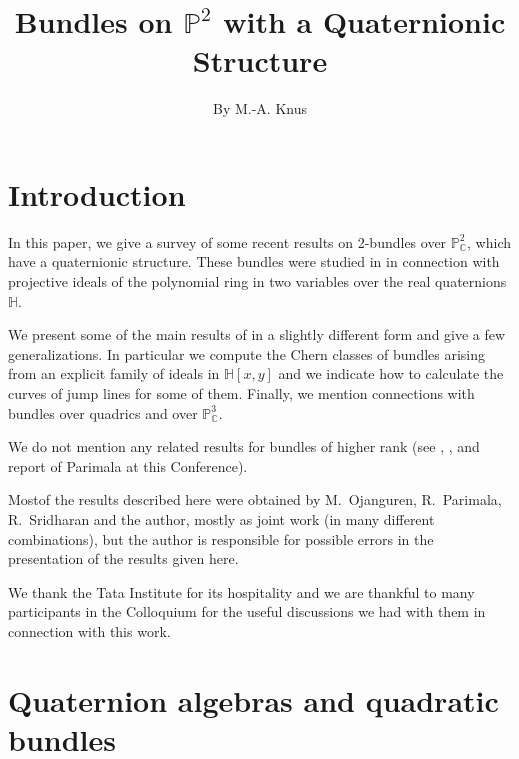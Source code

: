 \title{Bundles on $\mathbb{P}^{2}$ with a Quaternionic Structure}\label{chap9}

\author{By M.-A. Knus}

\date{}
\maketitle

\setcounter{page}{173}

\setcounter{pageoriginal}{224}
\section*{Introduction}\pageoriginale

In this paper, we give a survey of some recent results on 2-bundles
over $\mathbb{P}^{2}_{\mathbb{C}}$, which have a quaternionic
structure. These bundles were studied in \cite{chap9-key7} in
connection with projective ideals of the polynomial ring in two
variables over the real quaternions $\mathbb{H}$.

We present some of the main results of \cite{chap9-key7} in a slightly
different form and give a few generalizations. In particular we
compute the Chern classes of bundles arising from an explicit family
of ideals in $\mathbb{H}[x,y]$ and we indicate how to calculate the
curves of jump lines for some of them. Finally, we mention connections
with bundles over quadrics and over $\mathbb{P}^{3}_{\mathbb{C}}$.

We do not mention any related results for bundles of higher rank
(see \cite{chap9-key6}, \cite{chap9-key10}, \cite{chap9-key12} and
report of Parimala at this Conference). 

Most\pageoriginale of the
results described here were obtained by M.~Ojanguren, R.~Parimala,
R.~Sridharan and the author, mostly as joint work (in many different
combinations), but the author is responsible for possible errors in
the presentation of the results given here.

We thank the Tata Institute for its hospitality and we are thankful to
many participants in the Colloquium for the useful discussions we had
with them in connection with this work.

\section{Quaternion algebras and quadratic bundles}\label{chap9-sec1}

